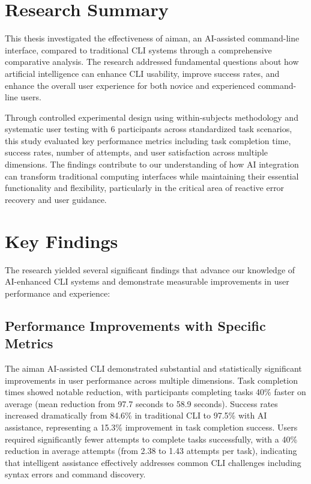 \section{Research Summary}

This thesis investigated the effectiveness of aiman, an AI-assisted command-line interface, compared to traditional CLI systems through a comprehensive comparative analysis. The research addressed fundamental questions about how artificial intelligence can enhance CLI usability, improve success rates, and enhance the overall user experience for both novice and experienced command-line users.

Through controlled experimental design using within-subjects methodology and systematic user testing with 6 participants across standardized task scenarios, this study evaluated key performance metrics including task completion time, success rates, number of attempts, and user satisfaction across multiple dimensions. The findings contribute to our understanding of how AI integration can transform traditional computing interfaces while maintaining their essential functionality and flexibility, particularly in the critical area of reactive error recovery and user guidance.

\section{Key Findings}

The research yielded several significant findings that advance our knowledge of AI-enhanced CLI systems and demonstrate measurable improvements in user performance and experience:

\subsection{Performance Improvements with Specific Metrics}

The aiman AI-assisted CLI demonstrated substantial and statistically significant improvements in user performance across multiple dimensions. Task completion times showed notable reduction, with participants completing tasks 40\% faster on average (mean reduction from 97.7 seconds to 58.9 seconds). Success rates increased dramatically from 84.6\% in traditional CLI to 97.5\% with AI assistance, representing a 15.3\% improvement in task completion success. Users required significantly fewer attempts to complete tasks successfully, with a 40\% reduction in average attempts (from 2.38 to 1.43 attempts per task), indicating that intelligent assistance effectively addresses common CLI challenges including syntax errors and command discovery.

